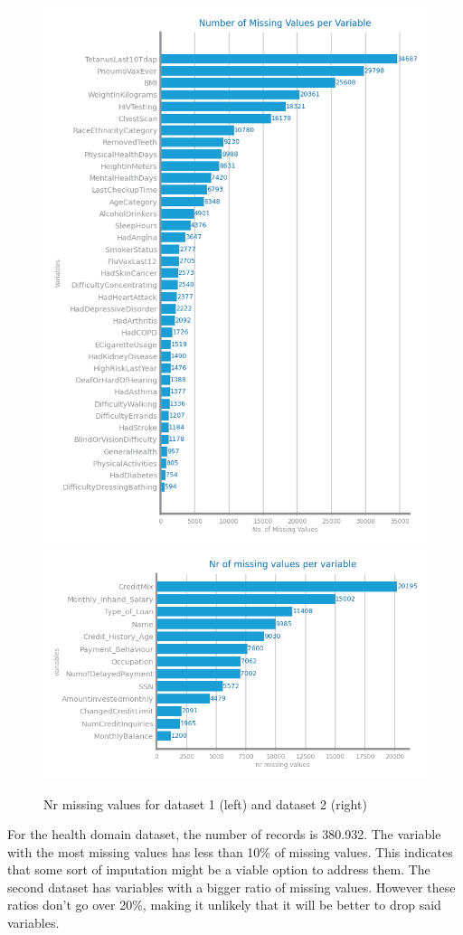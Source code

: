 \documentclass[10pt]{extarticle}
\begin{document}
\begin{figure}[H]
  \includegraphics[scale=0.70]{images/dataset1/data_profiling/CovidPos_mv.png}
  \centering\includegraphics[scale=0.7]{images/dataset2/data_profiling/Credit_Score_mv.png}
\caption{Nr missing values for dataset 1 (left) and dataset 2 (right)}
\end{figure}
For the health domain dataset, the number of records is 380.932. The variable with the most missing values has less than 10\% of missing values.
This indicates that some sort of imputation might be a viable option to address them. The second dataset has variables with a bigger ratio 
of missing values. However these ratios don't go over 20\%, making it unlikely that it will be better to drop said variables.
\end{document}
